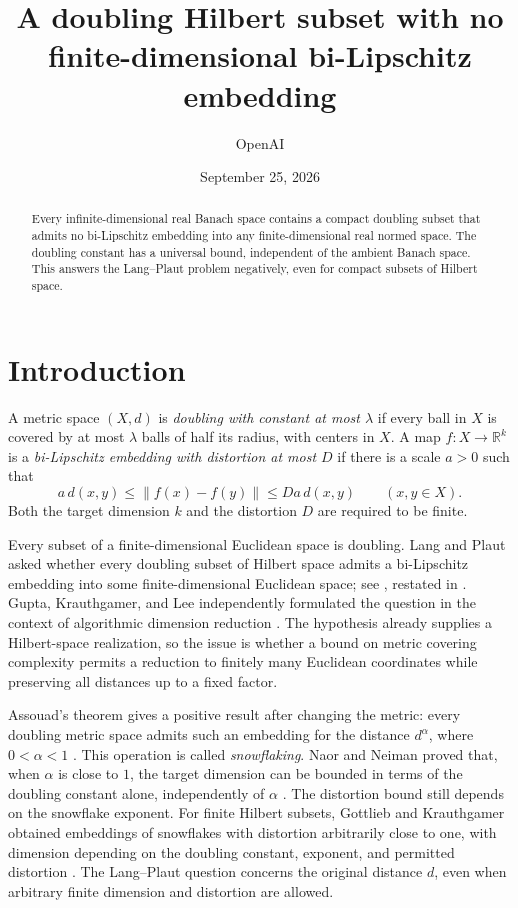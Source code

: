 \documentclass[11pt]{article}
\title{A doubling Hilbert subset with no finite-dimensional bi-Lipschitz embedding}
\author{OpenAI}
\date{September 25, 2026}
\newcommand{\R}{\mathbb R}
\newcommand{\norm}[1]{\left\lVert#1\right\rVert}
\begin{document}
\maketitle
\begin{abstract}
Every infinite-dimensional real Banach space contains a compact doubling subset that admits no bi-Lipschitz embedding into any finite-dimensional real normed space. The doubling constant has a universal bound, independent of the ambient Banach space. This answers the Lang--Plaut problem negatively, even for compact subsets of Hilbert space.
\end{abstract}

\section{Introduction}
\label{sec:introduction}
A metric space $(X,d)$ is \emph{doubling with constant at most $\lambda$} if every ball in $X$ is covered by at most $\lambda$ balls of half its radius, with centers in $X$. A map $f:X\to\R^k$ is a \emph{bi-Lipschitz embedding with distortion at most $D$} if there is a scale $a>0$ such that
\[
 a\,d(x,y)\le\norm{f(x)-f(y)}\le Da\,d(x,y)
 \qquad(x,y\in X).
\]
Both the target dimension $k$ and the distortion $D$ are required to be finite.

Every subset of a finite-dimensional Euclidean space is doubling. Lang and Plaut asked whether every doubling subset of Hilbert space admits a bi-Lipschitz embedding into some finite-dimensional Euclidean space; see \cite[Question 2.4]{LP}, restated in \cite[Question 1]{NN}. Gupta, Krauthgamer, and Lee independently formulated the question in the context of algorithmic dimension reduction \cite[Section 6, Question 1]{GKL}. The hypothesis already supplies a Hilbert-space realization, so the issue is whether a bound on metric covering complexity permits a reduction to finitely many Euclidean coordinates while preserving all distances up to a fixed factor.

Assouad's theorem gives a positive result after changing the metric: every doubling metric space admits such an embedding for the distance $d^\alpha$, where $0<\alpha<1$ \cite{Assouad}. This operation is called \emph{snowflaking}. Naor and Neiman proved that, when $\alpha$ is close to $1$, the target dimension can be bounded in terms of the doubling constant alone, independently of $\alpha$ \cite[Theorem 1.2]{NN}. The distortion bound still depends on the snowflake exponent. For finite Hilbert subsets, Gottlieb and Krauthgamer obtained embeddings of snowflakes with distortion arbitrarily close to one, with dimension depending on the doubling constant, exponent, and permitted distortion \cite[Theorem 1.2]{GK}. The Lang--Plaut question concerns the original distance $d$, even when arbitrary finite dimension and distortion are allowed.
\end{document}
